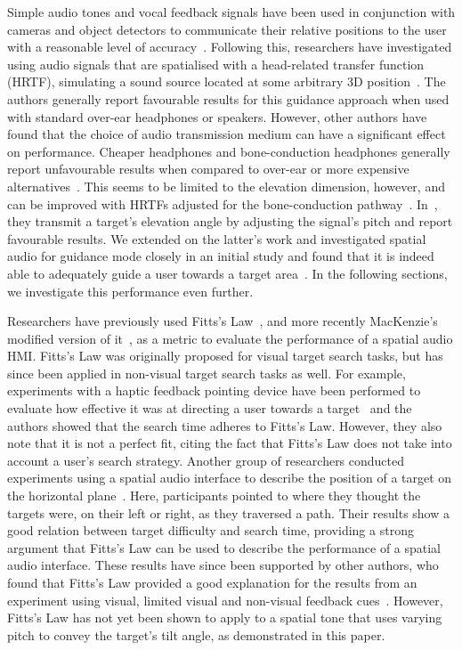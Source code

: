 \documentclass{article}
\begin{document}
Simple audio tones and vocal feedback signals have been used in conjunction with cameras and object detectors to communicate their relative positions to the user with a reasonable level of accuracy~\cite{schauerte2012assistive,tian2013computer,fiannaca2014headlock,vazquez2012helping}.
Following this, researchers have investigated using audio signals that are spatialised with a head-related transfer function (HRTF), simulating a sound source located at some arbitrary 3D position~\cite{geronazzo2016interactive,wilson2007swan,katz2010navig,blum2013spatialized}.
The authors generally report favourable results for this guidance approach when used with standard over-ear headphones or speakers. 
However, other authors have found that the choice of audio transmission medium can have a significant effect on performance.
Cheaper headphones and bone-conduction headphones generally report unfavourable results when compared to over-ear or more expensive alternatives~\cite{schonstein2008comparison,macdonald2006spatial,stanley2006lateralization}. 
This seems to be limited to the elevation dimension, however, and can be improved with HRTFs adjusted for the bone-conduction pathway~\cite{stanley2006lateralization}.
In~\cite{durette2008visuo}, they transmit a target's elevation angle by adjusting the signal's pitch and report favourable results. 
We extended on the latter's work and investigated spatial audio for guidance mode closely in an initial study and found that it is indeed able to adequately guide a user towards a target area~\cite{lock2019bone}.
In the following sections, we investigate this performance even further. 

Researchers have previously used Fitts's Law~\cite{fitts1954information}, and more recently MacKenzie's modified version of it~\cite{mackenzie1992fitts}, as a metric to evaluate the performance of a spatial audio HMI\@.
Fitts's Law was originally proposed for visual target search tasks, but has since been applied in non-visual target search tasks as well.
For example, experiments with a haptic feedback pointing device have been performed to evaluate how effective it was at directing a user towards a target~\cite{ahmaniemi2009augmented} and the authors showed that the search time adheres to Fitts's Law.
However, they also note that it is not a perfect fit, citing the fact that Fitts's Law does not take into account a user's search strategy.
Another group of researchers conducted experiments using a spatial audio interface to describe the position of a target on the horizontal plane~\cite{marentakis2006effects}.
Here, participants pointed to where they thought the targets were, on their left or right, as they traversed a path.
Their results show a good relation between target difficulty and search time, providing a strong argument that Fitts's Law can be used to describe the performance of a spatial audio interface.
These results have since been supported by other authors, who found that Fitts's Law provided a good explanation for the results from an experiment using visual, limited visual and non-visual feedback cues~\cite{wu2010fitts}.
However, Fitts's Law has not yet been shown to apply to a spatial tone that uses varying pitch to convey the target's tilt angle, as demonstrated in this paper.
\end{document}
